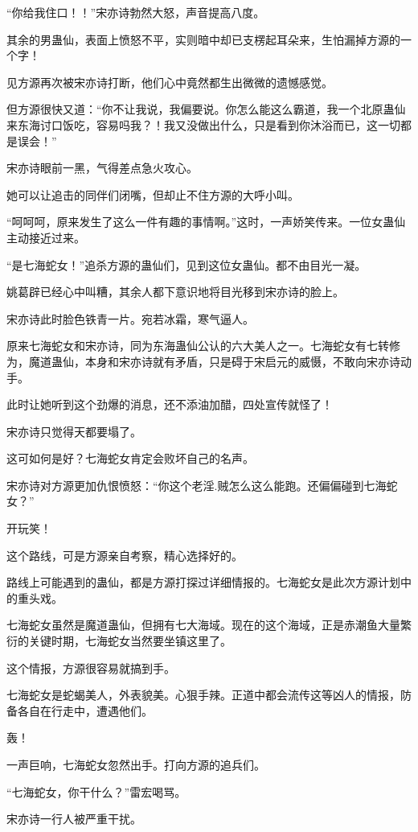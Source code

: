 \begin{this_body}
“你给我住口！！”宋亦诗勃然大怒，声音提高八度。

其余的男蛊仙，表面上愤怒不平，实则暗中却已支楞起耳朵来，生怕漏掉方源的一个字！

见方源再次被宋亦诗打断，他们心中竟然都生出微微的遗憾感觉。

但方源很快又道：“你不让我说，我偏要说。你怎么能这么霸道，我一个北原蛊仙来东海讨口饭吃，容易吗我？！我又没做出什么，只是看到你沐浴而已，这一切都是误会！”

宋亦诗眼前一黑，气得差点急火攻心。

她可以让追击的同伴们闭嘴，但却止不住方源的大呼小叫。

“呵呵呵，原来发生了这么一件有趣的事情啊。”这时，一声娇笑传来。一位女蛊仙主动接近过来。

“是七海蛇女！”追杀方源的蛊仙们，见到这位女蛊仙。都不由目光一凝。

姚葛辟已经心中叫糟，其余人都下意识地将目光移到宋亦诗的脸上。

宋亦诗此时脸色铁青一片。宛若冰霜，寒气逼人。

原来七海蛇女和宋亦诗，同为东海蛊仙公认的六大美人之一。七海蛇女有七转修为，魔道蛊仙，本身和宋亦诗就有矛盾，只是碍于宋启元的威慑，不敢向宋亦诗动手。

此时让她听到这个劲爆的消息，还不添油加醋，四处宣传就怪了！

宋亦诗只觉得天都要塌了。

这可如何是好？七海蛇女肯定会败坏自己的名声。

宋亦诗对方源更加仇恨愤怒：“你这个老淫.贼怎么这么能跑。还偏偏碰到七海蛇女？”

开玩笑！

这个路线，可是方源亲自考察，精心选择好的。

路线上可能遇到的蛊仙，都是方源打探过详细情报的。七海蛇女是此次方源计划中的重头戏。

七海蛇女虽然是魔道蛊仙，但拥有七大海域。现在的这个海域，正是赤潮鱼大量繁衍的关键时期，七海蛇女当然要坐镇这里了。

这个情报，方源很容易就搞到手。

七海蛇女是蛇蝎美人，外表貌美。心狠手辣。正道中都会流传这等凶人的情报，防备各自在行走中，遭遇他们。

轰！

一声巨响，七海蛇女忽然出手。打向方源的追兵们。

“七海蛇女，你干什么？”雷宏喝骂。

宋亦诗一行人被严重干扰。


\end{this_body}
